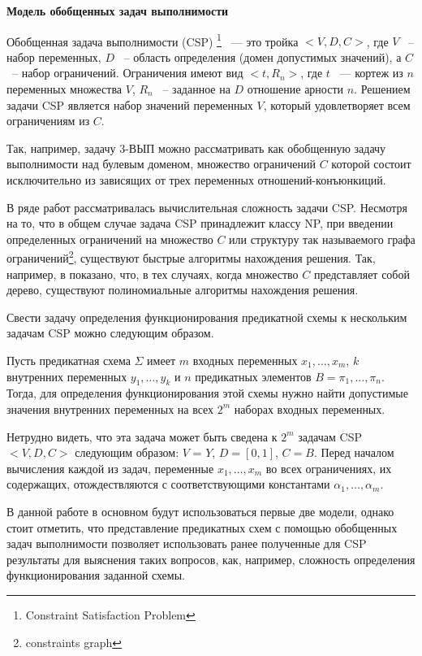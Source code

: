 \documentclass[12pt]{article}
\newenvironment{definition}[1][Определение]{\begin{trivlist}
\item[\hskip \labelsep {\bfseries #1}]}{\end{trivlist}}
\begin{document}
\textbf{Модель обобщенных задач выполнимости}

\begin{definition}
Обобщенная задача выполнимости (CSP) \footnote{Constraint Satisfaction Problem} 
~--- это тройка $<V,D,C>$, где $V$ ~-- набор переменных, $D$ ~-- область определения (домен допустимых значений), 
а $C$ ~-- набор ограничений. Ограничения имеют вид $<t, R_n>$, где $t$ ~--- кортеж из $n$ переменных множества $V$, 
$R_n$ ~-- заданное на $D$ отношение арности $n$. 
Решением задачи CSP является набор значений переменных $V$, который удовлетворяет всем ограничениям из $C$. 
\end{definition}

Так, например, задачу 3-ВЫП можно рассматривать как обобщенную задачу выполнимости над булевым доменом, множество
ограничений $C$ которой состоит исключительно из зависящих от трех переменных отношений-конъюнкиций.

В ряде работ рассматривалась вычислительная сложность задачи CSP. Несмотря на то, что в общем случае задача CSP
принадлежит классу NP, при введении определенных ограничений на множество $C$ или структуру так называемого
графа ограничений\footnote{constraints graph}, существуют быстрые алгоритмы нахождения решения. 
Так, например, в \cite{Shaeffer78} показано, 
что, в тех случаях, когда множество $C$ представляет собой дерево, существуют полиномиальные алгоритмы нахождения решения.

Свести задачу определения функционирования предикатной схемы к нескольким задачам CSP можно следующим образом.

Пусть предикатная схема $\Sigma$ имеет $m$ входных переменных $x_1, \ldots , x_m$, 
$k$ внутренних переменных $y_1, \ldots , y_k$ и $n$ предикатных элементов $B = \pi_1, \dots , \pi_n$. 
Тогда, для определения функционирования этой схемы нужно найти допустимые значения внутренних переменных на всех $2^{m}$
наборах входных переменных. 

Нетрудно видеть, что эта задача может быть сведена к $2^m$ задачам CSP $<V, D, C>$ следующим образом:
$V$ = $Y$, $D = [0, 1]$, $C = B$. Перед началом вычисления каждой из задач, переменные $x_1, \ldots , x_m$ 
во всех ограничениях, их содержащих, отождествляются с соответствующими константами $\alpha_1, \ldots , \alpha_m$.

В данной работе в основном будут использоваться первые две модели, однако стоит отметить, что представление предикатных
схем с помощью обобщенных задач выполнимости позволяет использовать ранее полученные для CSP результаты для 
выяснения таких вопросов, как, например, сложность определения функционирования заданной схемы.
\end{document}
